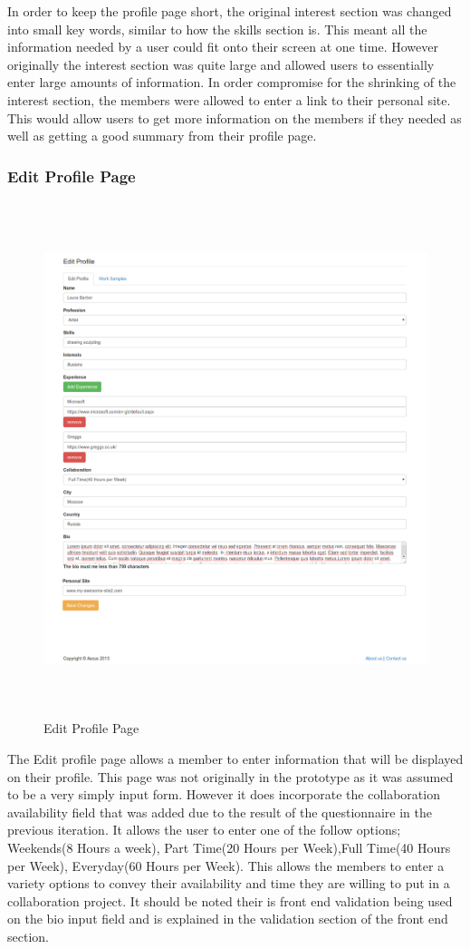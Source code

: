 \documentclass[a4paper,oneside,11pt]{report}
\begin{document}
In order to keep the profile page short, the original interest section was changed into small key words, similar to how the skills section is. This meant all the information needed by a user could fit onto their screen at one time. However originally the interest section was quite large and allowed users to essentially enter large amounts of information. In order compromise for the shrinking of the interest section, the members were allowed to enter a link to their personal site. This would allow users to get more information on the members if they needed as well as getting a good summary from their profile page.
\pagebreak

\subsubsection{Edit Profile Page}
\begin{figure}[!ht]
\centering
\includegraphics[width=\textwidth,height=15cm,keepaspectratio]{edit-profile-second-iteration.png}
\caption{Edit Profile Page}
\end{figure}
The Edit profile page allows a member to enter information that will be displayed on their profile. This page was not originally in the prototype as it was assumed to be a very simply input form. However it does incorporate the collaboration availability field that was added due to the result of the questionnaire in the previous iteration. It allows the user to enter one of the follow options; Weekends(8 Hours a week),
Part Time(20 Hours per Week),Full Time(40 Hours per Week), Everyday(60 Hours per Week). This allows the members to enter a variety options to convey their availability and time they are willing to put in a collaboration project. It should be noted their is front end validation being used on the bio input field and is explained in the validation section of the front end section.
\pagebreak
\end{document}
